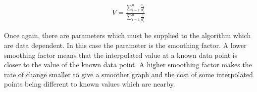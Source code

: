             \begin{align*}
                V = \frac{\sum_{i=1}^{n}{\frac{v_{i}}{d^{p}_{i}}}}{\sum_{i=1}^{n}{\frac{1}{d^{p}_{i}}}}
            \end{align*}

            Once again, there are parameters which must be supplied to the algorithm which are data dependent. In this case the parameter is the smoothing factor. A lower smoothing factor means that the interpolated value at a known data point is closer to the value of the known data point. A higher smoothing factor makes the rate of change smaller to give a smoother graph and the cost of some interpolated points being different to known values which are nearby.

